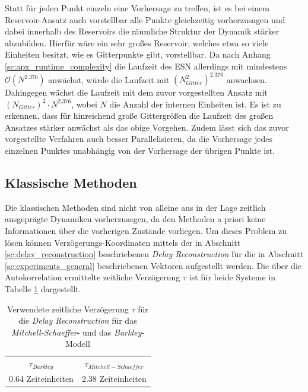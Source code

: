 Statt für jeden Punkt einzeln eine Vorhersage zu treffen, ist es bei einem Reservoir-Ansatz auch vorstellbar alle Punkte gleichzeitig vorherzusagen und dabei innerhalb des Reservoirs die räumliche Struktur der Dynamik stärker abzubilden. Hierfür wäre ein sehr großes Reservoir, welches etwa so viele Einheiten besitzt, wie es Gitterpunkte gibt, vorstellbar. Da nach Anhang \ref{sc:apx_runtime_complexity} die Laufzeit des \textsc{ESN} allerdings mit mindestens $\mathcal{O}(N^{2.376})$ anwächst, würde die Laufzeit mit $(N_{Gitter}^2)^{2.376}$ anwachsen. Dahingegen wächst die Laufzeit mit dem zuvor vorgestellten Ansatz mit $(N_{Gitter})^2 \cdot N^{2.376}$, wobei $N$ die Anzahl der internen Einheiten ist. Es ist zu erkennen, dass für hinreichend große Gittergrößen die Laufzeit des großen Ansatzes stärker anwächst als das obige Vorgehen. Zudem lässt sich das zuvor vorgestellte Verfahren auch besser Parallelisieren, da die Vorhersage jedes einzelnen Punktes unabhängig von der Vorhersage der übrigen Punkte ist.   

\FloatBarrier
\subsection{Klassische Methoden}
Die klassischen Methoden sind nicht von alleine aus in der Lage zeitlich ausgeprägte Dynamiken vorherzusagen, da den Methoden a priori keine Informationen über die vorherigen Zustände vorliegen. Um dieses Problem zu lösen können Verzögerungs-Koordinaten mittels der in Abschnitt \ref{sc:delay_reconstruction} beschriebenen \textit{Delay Reconstruction} für die in Abschnitt \ref{sc:experiments_general} beschriebenen Vektoren aufgestellt werden. Die über die Autokorrelation ermittelte zeitliche Verzögerung $\tau$ ist für beide Systeme in Tabelle \ref{tab:delay_reconstruction_tau} dargestellt.     

\begin{table}[h]
\centering
\begin{tabular}{cc}
\hline
$\tau_{Barkley}$ & $\tau_{Mitchell-Schaeffer}$ \\ 
0.64 Zeiteinheiten & 2.38 Zeiteinheiten\\ 
\hline 
\end{tabular} 
\caption{Verwendete zeitliche Verzögerung $\tau$ für die \textit{Delay Reconstruction} für das \textit{Mitchell-Schaeffer}- und das \textit{Barkley}-Modell}
\label{tab:delay_reconstruction_tau}
\end{table} 



